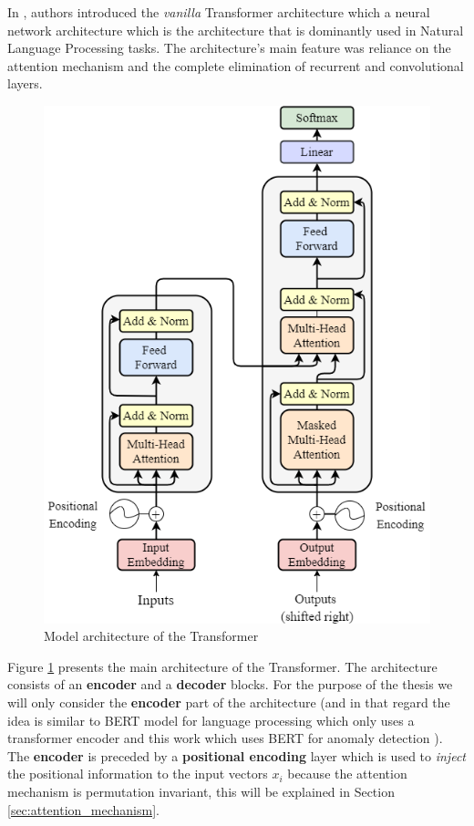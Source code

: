 \documentclass[a4paper, twoside]{report}
\theoremstyle{definition}
\numberwithin{equation}{section}
\begin{document}
In \cite{1706.03762}, authors introduced the \textit{vanilla} Transformer architecture which a neural network architecture
which is the architecture that is dominantly used in Natural Language Processing tasks.
The architecture's main feature was reliance on the attention mechanism and the complete elimination
of recurrent and convolutional layers.

\begin{figure}[h]
    \centering
    \includegraphics[scale=0.5]{attention_is_all_you_need.png}
    \caption{Model architecture of the Transformer \cite{1706.03762}}
    \label{fig:attention_is_all_you_need}
\end{figure}

Figure \ref{fig:attention_is_all_you_need} presents the main architecture of the Transformer.
The architecture consists of an \textbf{encoder} and a \textbf{decoder} blocks.
For the purpose of the thesis we will only consider the \textbf{encoder} part of the architecture
(and in that regard the idea is similar to BERT model for language processing \cite{Devlin2019BERTPO}
which only uses a transformer encoder and this work which uses BERT for anomaly detection \cite{Jeong2023AnomalyBERTST}).
The \textbf{encoder} is preceded by a \textbf{positional encoding} layer which is used to \emph{inject} the positional information
to the input vectors $x_i$ because the attention mechanism is permutation invariant,
this will be explained in Section \ref{sec:attention_mechanism}.
\end{document}
